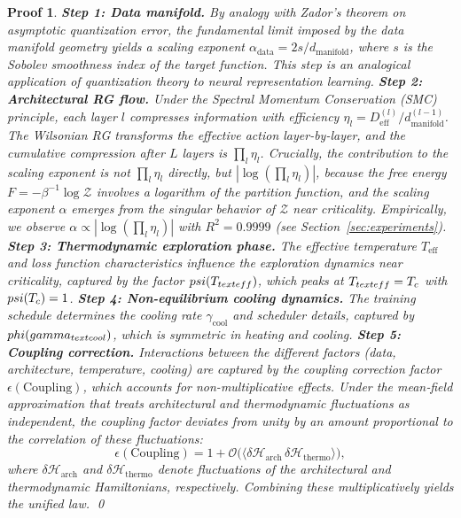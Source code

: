 \documentclass[11pt, a4paper]{article}
\theoremstyle{plain}
\newtheorem*{pf}{Proof}
\def\sZ{{\mathcal Z}}
\begin{document}
\begin{pf}
\textbf{Step 1: Data manifold.} By analogy with Zador's theorem on asymptotic quantization error, the fundamental limit imposed by the data manifold geometry yields a scaling exponent $\alpha_{\text{data}} = 2s/d_{\text{manifold}}$, where $s$ is the Sobolev smoothness index of the target function. This step is an analogical application of quantization theory to neural representation learning.
\textbf{Step 2: Architectural RG flow.} Under the Spectral Momentum Conservation (SMC) principle, each layer $l$ compresses information with efficiency $\eta_l = D_{\text{eff}}^{(l)}/d_{\text{manifold}}^{(l-1)}$. The Wilsonian RG transforms the effective action layer-by-layer, and the cumulative compression after $L$ layers is $\prod_l \eta_l$. Crucially, the contribution to the scaling exponent is not $\prod_l \eta_l$ directly, but $|\log(\prod_l \eta_l)|$, because the free energy $F = -\beta^{-1}\log\sZ$ involves a logarithm of the partition function, and the scaling exponent $\alpha$ emerges from the singular behavior of $\sZ$ near criticality. Empirically, we observe $\alpha \propto |\log(\prod_l \eta_l)|$ with $R^2 = 0.9999$ (see Section~\ref{sec:experiments}).
\textbf{Step 3: Thermodynamic exploration phase.} The effective temperature $T_{\text{eff}}$ and loss function characteristics influence the exploration dynamics near criticality, captured by the factor $\\psi(T_{\\text{eff}})$, which peaks at $T_{\\text{eff}} = T_c$ with $\\psi(T_c) = 1$.
\textbf{Step 4: Non-equilibrium cooling dynamics.} The training schedule determines the cooling rate $\gamma_{\text{cool}}$ and scheduler details, captured by $\\phi(\\gamma_{\\text{cool}})$, which is symmetric in heating and cooling.
\textbf{Step 5: Coupling correction.} Interactions between the different factors (data, architecture, temperature, cooling) are captured by the coupling correction factor $\epsilon(\text{Coupling})$, which accounts for non-multiplicative effects. Under the mean‑field approximation that treats architectural and thermodynamic fluctuations as independent, the coupling factor deviates from unity by an amount proportional to the correlation of these fluctuations:
\begin{equation}
\epsilon(\text{Coupling}) = 1 + \mathcal{O}\big(\langle \delta\mathcal{H}_{\text{arch}} \,\delta\mathcal{H}_{\text{thermo}} \rangle\big),
\end{equation}
where $\delta\mathcal{H}_{\text{arch}}$ and $\delta\mathcal{H}_{\text{thermo}}$ denote fluctuations of the architectural and thermodynamic Hamiltonians, respectively.
Combining these multiplicatively yields the unified law.
\qed
\end{pf}
\end{document}
